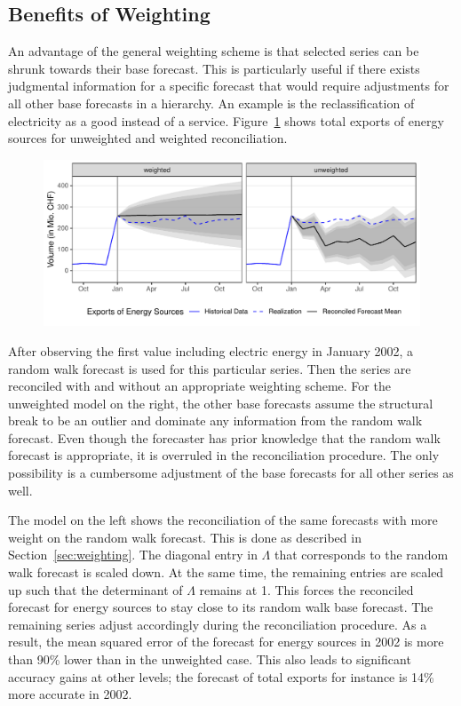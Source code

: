 \documentclass[a4paper,fleqn,11pt]{article}
\begin{document}
\subsection{Benefits of Weighting}\label{sec:resweight}

An advantage of the general weighting scheme is that selected series can be shrunk towards their base forecast. This is particularly useful if there exists judgmental information for a specific forecast that would require adjustments for all other base forecasts in a hierarchy. An example is the reclassification of electricity as a good instead of a service. Figure~\ref{fig:fcex} shows total exports of energy sources for unweighted and weighted reconciliation.

\begin{figure}[H]
	\includegraphics[width=\textwidth]{fig/fig_electricity}
	\label{fig:fcex}
\end{figure}

After observing the first value including electric energy in January 2002, a random walk forecast is used for this particular series. Then the series are reconciled with and without an appropriate weighting scheme. For the unweighted model on the right, the other base forecasts assume the structural break to be an outlier and dominate any information from the random walk forecast. Even though the forecaster has prior knowledge that the random walk forecast is appropriate, it is overruled in the reconciliation procedure. The only possibility is a cumbersome adjustment of the base forecasts for all other series as well.

The model on the left shows the reconciliation of the same forecasts with more weight on the random walk forecast. This is done as described in Section~\ref{sec:weighting}. The diagonal entry in $\Lambda$ that corresponds to the random walk forecast is scaled down. At the same time, the remaining entries are scaled up such that the determinant of $\Lambda$ remains at 1. This forces the reconciled forecast for energy sources to stay close to its random walk base forecast. The remaining series adjust accordingly during the reconciliation procedure. As a result, the mean squared error of the forecast for energy sources in 2002 is more than 90\% lower than in the unweighted case. This also leads to significant accuracy gains at other levels; the forecast of total exports for instance is 14\% more accurate in 2002.
\end{document}

